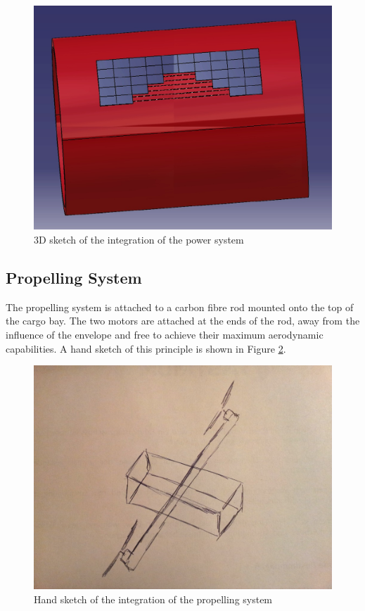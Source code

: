 \pagebreak

\begin{figure}[bht]
\centering
\includegraphics[scale=0.4]{figures/mesh.jpg}
\caption{3D sketch of the integration of the power system}
\label{fig:mesh}
\end{figure}

\subsection{Propelling System}

The propelling system is attached to a carbon fibre rod mounted onto the top of the cargo bay. The two motors are attached at the ends of the rod, away from the influence of the envelope and free to achieve their maximum aerodynamic capabilities. A hand sketch of this principle is shown in Figure \ref{fig:prop}.

\begin{figure}[h!]
\centering
\includegraphics[scale = 0.3]{figures/prop.jpg}
\caption{Hand sketch of the integration of the propelling system}
\label{fig:prop}
\end{figure}

